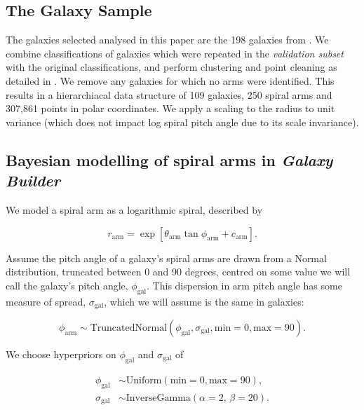 \subsection{The Galaxy Sample}
The galaxies selected analysed in this paper are the 198 galaxies from . We combine classifications of galaxies which were repeated in the \textit{validation subset} with the original classifications, and perform clustering and point cleaning as detailed in . We remove any galaxies for which no arms were identified. This results in a hierarchiacal data structure of 109 galaxies, 250 spiral arms and 307,861 points in polar coordinates. We apply a scaling to the radius to unit variance (which does not impact log spiral pitch angle due to its scale invariance).


\subsection{Bayesian modelling of spiral arms in \textit{Galaxy Builder}}

We model a spiral arm as a logarithmic spiral, described by

\begin{equation}
r_\mathrm{arm} = \exp\left[\theta_\mathrm{arm}\tan\phi_\mathrm{arm} + c_\mathrm{arm}\right].
\end{equation}

Assume the pitch angle of a galaxy's spiral arms are drawn from a Normal distribution, truncated between 0 and 90 degrees, centred on some value we will call the galaxy's pitch angle, $\phi_\mathrm{gal}$. This dispersion in arm pitch angle has some measure of spread, $\sigma_\mathrm{gal}$, which we will assume is the same in galaxies:

\begin{equation}
\phi_\mathrm{arm} \sim \mathrm{TruncatedNormal}(\phi_\mathrm{gal}, \sigma_\mathrm{gal}, \mathrm{min}=0, \mathrm{max}=90).
\end{equation}

We choose hyperpriors on $\phi_\mathrm{gal}$ and $\sigma_\mathrm{gal}$ of

\begin{align}
  \phi_\mathrm{gal} &\sim \mathrm{Uniform}(\mathrm{min}=0, \mathrm{max}=90),\\
  \sigma_\mathrm{gal} &\sim \mathrm{InverseGamma}(\alpha=2,\,\beta=20).
\end{align}

